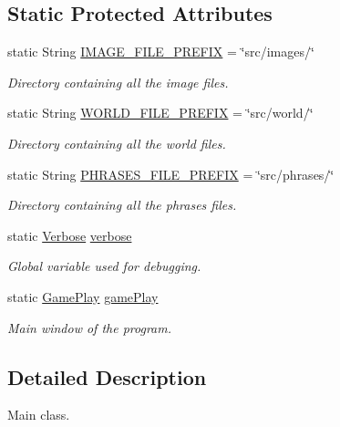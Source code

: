 \subsection*{Static Protected Attributes}
\begin{DoxyCompactItemize}
\item 
static String \hyperlink{classmain_1_1_philophobia_a1e42124b5f083b3b4f1e6eb5ba774552}{I\-M\-A\-G\-E\-\_\-\-F\-I\-L\-E\-\_\-\-P\-R\-E\-F\-I\-X} = \char`\"{}src/images/\char`\"{}
\begin{DoxyCompactList}\small\item\em Directory containing all the image files. \end{DoxyCompactList}\item 
static String \hyperlink{classmain_1_1_philophobia_a7502fe9b6042326072c5be7be632cc6c}{W\-O\-R\-L\-D\-\_\-\-F\-I\-L\-E\-\_\-\-P\-R\-E\-F\-I\-X} = \char`\"{}src/world/\char`\"{}
\begin{DoxyCompactList}\small\item\em Directory containing all the world files. \end{DoxyCompactList}\item 
static String \hyperlink{classmain_1_1_philophobia_a076b568405c08c4b22e22a1d7c985124}{P\-H\-R\-A\-S\-E\-S\-\_\-\-F\-I\-L\-E\-\_\-\-P\-R\-E\-F\-I\-X} = \char`\"{}src/phrases/\char`\"{}
\begin{DoxyCompactList}\small\item\em Directory containing all the phrases files. \end{DoxyCompactList}\item 
static \hyperlink{classdebug_1_1_verbose}{Verbose} \hyperlink{classmain_1_1_philophobia_a83cf82b16e2feb6ede60c8c076be10ec}{verbose}
\begin{DoxyCompactList}\small\item\em Global variable used for debugging. \end{DoxyCompactList}\item 
static \hyperlink{classgameplay_1_1_game_play}{Game\-Play} \hyperlink{classmain_1_1_philophobia_a1abf384f2796e5ab254ff71c36ef939d}{game\-Play}
\begin{DoxyCompactList}\small\item\em Main window of the program. \end{DoxyCompactList}\end{DoxyCompactItemize}


\subsection{Detailed Description}
Main class. 

